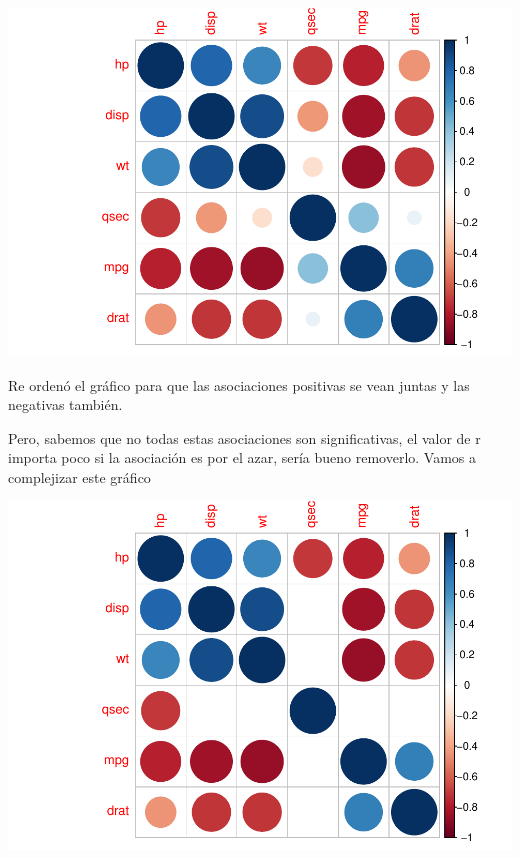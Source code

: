 \documentclass[
]{book}
\newenvironment{Shaded}{\begin{snugshade}}{\end{snugshade}}
\newcommand{\AttributeTok}[1]{\textcolor[rgb]{0.77,0.63,0.00}{#1}}
\newcommand{\CommentTok}[1]{\textcolor[rgb]{0.56,0.35,0.01}{\textit{#1}}}
\newcommand{\FloatTok}[1]{\textcolor[rgb]{0.00,0.00,0.81}{#1}}
\newcommand{\FunctionTok}[1]{\textcolor[rgb]{0.00,0.00,0.00}{#1}}
\newcommand{\NormalTok}[1]{#1}
\newcommand{\SpecialCharTok}[1]{\textcolor[rgb]{0.00,0.00,0.00}{#1}}
\newcommand{\StringTok}[1]{\textcolor[rgb]{0.31,0.60,0.02}{#1}}
\begin{document}
\includegraphics{Esatadistica_en_R_files/figure-latex/unnamed-chunk-222-1.pdf}

Re ordenó el gráfico para que las asociaciones positivas se vean juntas y las negativas también.

Pero, sabemos que no todas estas asociaciones son significativas, el valor de r importa poco si la asociación es por el azar, sería bueno removerlo. Vamos a complejizar este gráfico

\begin{Shaded}
\end{Shaded}

\includegraphics{Esatadistica_en_R_files/figure-latex/unnamed-chunk-223-1.pdf}
\end{document}

